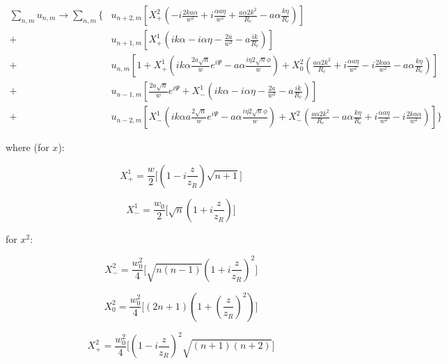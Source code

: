 \documentclass[aps,twoside,secnumarabic,balancelastpage,amsmath,amssymb,nofootinbib,hyperref=pdftex]{revtex4}
\begin{document}
\begin{align*}
\sum_{n,m} u_{n,m} \rightarrow 
	\sum_{n,m} 
	\lbrace &
		u_{n+2,m}[ X_+^2
		(-i\frac{2ka\alpha}{w^2} 
			+  i \frac{\alpha a \eta }{w^2}
			+ \frac{a\alpha 2k^2}{R_c} 
			- a \alpha \frac{k \eta }{R_c}
			)]
		\\+&
		u_{n+1,m}
			[ X_+^1(ik\alpha 
			- i\alpha \eta 
			- \frac{2a}{w^2} 
			- a \frac{ik}{R_c})
			]
		\\+&
		u_{n,m} 
			[1
			+X_+^1
			(ik\alpha \frac{2a\sqrt{n}}{w} e^{i\Psi}
			- a\alpha \frac{i \eta 2 \sqrt{n} \phi}{w})
			+ X_0^2 ( 
			\frac{a\alpha 2k^2}{R_c} 
			+  i \frac{\alpha a \eta }{w^2}  
			- i\frac{2ka\alpha}{w^2}
			- a \alpha \frac{k \eta }{R_c}
			)
			]
		\\+&
		u_{n-1,m} 
			[
		\frac{2a\sqrt{n}}{w} e^{i\Psi} 
			+ 	X_-^1(
				ik\alpha 
				- i\alpha \eta 
				- \frac{2a}{w^2}
		 		- a \frac{ik}{R_c}
		 		)
		 	]
		\\+&
		u_{n-2,m} 
		[ X_-^1(
		ik\alpha a\frac{2\sqrt{n}}{w}e^{i\Psi}
		- a\alpha \frac{i \eta 2 \sqrt{n} \phi}{w}
		) 
		+ X_-^2 (
			 \frac{a\alpha 2k^2}{R_c} 
			 - a \alpha \frac{k \eta }{R_c}
			+  i \frac{\alpha a \eta }{w^2}
			-i\frac{2ka\alpha}{w^2}
		)
		] 	
	\rbrace
\end{align*}

where (for $x$):

\begin{equation*}
X_+^1 = \frac{w}{2}
\Big[
	(1 - i \frac{z}{z_R})
	\sqrt{n+1} 
\Big]
\end{equation*}

\begin{equation*}
X_-^1 = \frac{w_0}{2}
\Big[
	\sqrt{n}
	(1+i \frac{z}{z_R})
\Big]
\end{equation*}

for $x^2$:

\begin{equation*}
X_-^2 = \frac{w_0^2}{4}
\Big[
	\sqrt{n(n-1)}
	(1+i \frac{z}{z_R} )^2
\Big]
\end{equation*}

\begin{equation*}
X_0^2 = \frac{w_0^2}{4}
\Big[
	(2n+1)
	(1+ (\frac{z}{z_R})^2)
\Big]
\end{equation*}

\begin{equation*}
X_+^2 = \frac{w_0^2}{4}
\Big[
	(1 - i \frac{z}{z_R})^2
	\sqrt{(n+1)(n+2)}
\Big]
\end{equation*}

\clearpage
\end{document}
